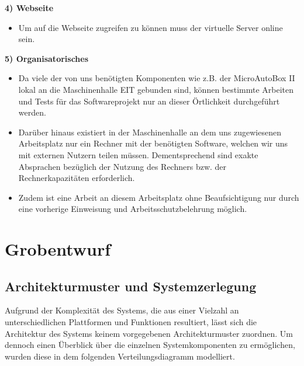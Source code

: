 \documentclass[fontsize = 12pt, paper = a4]{scrreprt}
\begin{document}
\textbf{4) Webseite}

\begin{itemize}

\item Um auf die Webseite zugreifen zu können muss der virtuelle Server online sein.

\end{itemize}

\textbf{5) Organisatorisches}

\begin{itemize}

\item Da viele der von uns benötigten Komponenten wie z.B. der MicroAutoBox II lokal an die Maschinenhalle EIT gebunden sind, können bestimmte Arbeiten und Tests für das Softwareprojekt nur an dieser Örtlichkeit durchgeführt werden.

\item Darüber hinaus existiert in der Maschinenhalle an dem uns zugewiesenen Arbeitsplatz nur ein Rechner mit der benötigten Software, welchen wir uns mit externen Nutzern teilen müssen. Dementsprechend sind exakte Absprachen bezüglich der Nutzung des Rechners bzw. der Rechnerkapazitäten erforderlich.

\item Zudem ist eine Arbeit an diesem Arbeitsplatz ohne Beaufsichtigung nur durch eine vorherige Einweisung und Arbeitsschutzbelehrung möglich.

\end{itemize}


\chapter{Grobentwurf}

\section{Architekturmuster und Systemzerlegung}

Aufgrund der Komplexität des Systems, die aus einer Vielzahl an unterschiedlichen Plattformen und Funktionen resultiert, lässt sich die Architektur des Systems keinem vorgegebenen Architekturmuster zuordnen. Um dennoch einen Überblick über die einzelnen Systemkomponenten zu ermöglichen, wurden diese in dem folgenden Verteilungsdiagramm modelliert. \\
\end{document}
